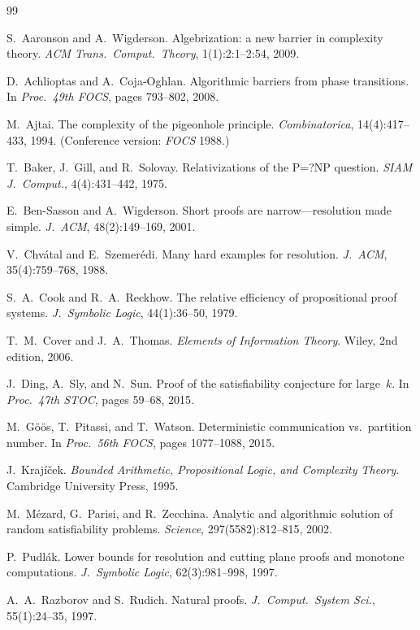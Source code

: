 \documentclass[11pt]{article}
\theoremstyle{definition}
\begin{document}
\begin{thebibliography}{99}

S.~Aaronson and A.~Wigderson.
\newblock Algebrization: a new barrier in complexity theory.
\newblock \emph{ACM Trans.\ Comput.\ Theory}, 1(1):2:1--2:54, 2009.

D.~Achlioptas and A.~Coja-Oghlan.
\newblock Algorithmic barriers from phase transitions.
\newblock In \emph{Proc.\ 49th FOCS}, pages 793--802, 2008.

M.~Ajtai.
\newblock The complexity of the pigeonhole principle.
\newblock \emph{Combinatorica}, 14(4):417--433, 1994.
\newblock (Conference version: \emph{FOCS} 1988.)

T.~Baker, J.~Gill, and R.~Solovay.
\newblock Relativizations of the {P}=?{NP} question.
\newblock \emph{SIAM J.\ Comput.}, 4(4):431--442, 1975.

E.~Ben-Sasson and A.~Wigderson.
\newblock Short proofs are narrow---resolution made simple.
\newblock \emph{J.\ ACM}, 48(2):149--169, 2001.

V.~Chv\'atal and E.~Szemer\'edi.
\newblock Many hard examples for resolution.
\newblock \emph{J.\ ACM}, 35(4):759--768, 1988.

S.~A.~Cook and R.~A.~Reckhow.
\newblock The relative efficiency of propositional proof systems.
\newblock \emph{J.\ Symbolic Logic}, 44(1):36--50, 1979.

T.~M.~Cover and J.~A.~Thomas.
\newblock \emph{Elements of Information Theory}.
\newblock Wiley, 2nd edition, 2006.

J.~Ding, A.~Sly, and N.~Sun.
\newblock Proof of the satisfiability conjecture for large~$k$.
\newblock In \emph{Proc.\ 47th STOC}, pages 59--68, 2015.

M.~G\"o\"os, T.~Pitassi, and T.~Watson.
\newblock Deterministic communication vs.\ partition number.
\newblock In \emph{Proc.\ 56th FOCS}, pages 1077--1088, 2015.

J.~Kraj\'i\v{c}ek.
\newblock \emph{Bounded Arithmetic, Propositional Logic, and Complexity Theory}.
\newblock Cambridge University Press, 1995.

M.~M\'ezard, G.~Parisi, and R.~Zecchina.
\newblock Analytic and algorithmic solution of random satisfiability
problems.
\newblock \emph{Science}, 297(5582):812--815, 2002.

P.~Pudl\'ak.
\newblock Lower bounds for resolution and cutting plane proofs and
monotone computations.
\newblock \emph{J.\ Symbolic Logic}, 62(3):981--998, 1997.

A.~A.~Razborov and S.~Rudich.
\newblock Natural proofs.
\newblock \emph{J.\ Comput.\ System Sci.}, 55(1):24--35, 1997.

\end{thebibliography}
\end{document}
